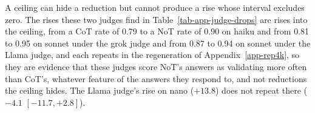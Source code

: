 A ceiling can hide a reduction but cannot produce a rise whose interval
excludes zero. The rises these two judges find in Table~\ref{tab-app-judge-drops}
are rises into the ceiling, from a CoT rate of 0.79 to a NoT rate of 0.90 on
haiku and from 0.81 to 0.95 on sonnet under the grok judge and from 0.87 to
0.94 on sonnet under the Llama judge, and each repeats in the regeneration of
Appendix~\ref{app-rep4k}, so they are evidence that these judges score NoT's
answers as validating more often than CoT's, whatever feature of the answers
they respond to, and not reductions the ceiling hides. The Llama judge's
rise on nano ($+13.8$) does not repeat there ($-4.1$ $[-11.7, +2.8]$).

